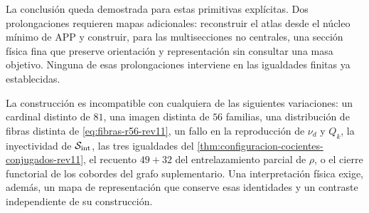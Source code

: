 La conclusión queda demostrada para estas primitivas explícitas. Dos
prolongaciones requieren mapas adicionales: reconstruir el atlas desde el
núcleo mínimo de APP y construir, para las multisecciones no centrales, una
sección física fina que preserve orientación y representación sin consultar
una masa objetivo. Ninguna de esas prolongaciones interviene en las
igualdades finitas ya establecidas.

La construcción es incompatible con cualquiera de las siguientes
variaciones: un cardinal distinto de \(81\), una imagen distinta de \(56\)
familias, una distribución de fibras distinta de
\eqref{eq:fibras-r56-rev11}, un fallo en la reproducción de
\(\nu_d\) y \(Q_k\), la inyectividad de
\(\mathcal S_{\rm int}\), las tres igualdades del
\cref{thm:configuracion-cocientes-conjugados-rev11}, el recuento
\(49+32\) del entrelazamiento parcial de \(\rho\), o el cierre functorial de
los cobordes del grafo suplementario. Una interpretación física exige,
además, un mapa de representación que conserve esas identidades y un
contraste independiente de su construcción.
